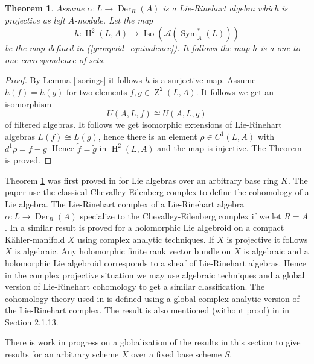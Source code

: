 \documentclass{amsart}
\theoremstyle{plain}
\newtheorem{theorem}{Theorem}[section]
\theoremstyle{definition}
\theoremstyle{remark}
\numberwithin{equation}{theorem}
\begin{document}
\begin{theorem}\label{maindeform}
  Assume $\alpha:L\rightarrow {\operatorname{Der} }_{R}({A})$ is a Lie-Rinehart algebra which is projective as left ${A}$-module.
Let the map
\[ h: {\operatorname{H} }^2(L,{A}) \rightarrow {\operatorname{Iso} } ({\mathcal{A}} ({\operatorname{Sym} }_{A}^*(L))) \]
be the map defined in (\ref{groupoid_equivalence}).
It follows the map $h$ is a one to one correspondence of sets.
\end{theorem}
\begin{proof} By Lemma \ref{isorings} it follows $h$ is a surjective map. Assume $h(f)=h(g)$ for two elements
$f,g\in {\operatorname{Z}}^2(L,{A})$. It follows we get an isomorphism
\[ U({A},L,f)\cong U({A},L,g) \]
of filtered algebras.
It follows we get isomorphic extensions of Lie-Rinehart algebras $L(f)\cong L(g)$, hence there is an element
$\rho \in C^1(L,{A})$ with $d^1\rho=f-g$. Hence $\tilde{f}=\tilde{g}$ in ${\operatorname{H} }^2(L,{A})$ and the map is injective. 
The Theorem is proved.
\end{proof}

Theorem \ref{maindeform} was first proved in \cite{sridharan} for Lie algebras over an arbitrary base ring $K$.
The paper \cite{sridharan} use the classical Chevalley-Eilenberg complex to define the cohomology
of a Lie algebra. The Lie-Rinehart complex of a Lie-Rinehart algebra $\alpha:L\rightarrow {\operatorname{Der} }_{R}({A})$ specialize
to the Chevalley-Eilenberg complex if we let ${R}={A}$.  
In \cite{tortella} a similar result is proved for a holomorphic Lie algebroid on a
compact K\"{a}hler-manifold $X$ using complex analytic techniques. If $X$ is projective it follows $X$ is algebraic.
Any holomorphic finite rank vector bundle on $X$ is algebraic and a holomorphic Lie algebroid corresponds to
a sheaf of Lie-Rinehart algebras. Hence in the complex projective situation we may use algebraic techniques 
and a global version of Lie-Rinehart cohomology to get a similar classification.
The cohomology theory used in \cite{tortella} is defined using a global complex analytic version of 
the Lie-Rinehart complex. The result is also mentioned (without proof) in \cite{beilinson} in Section 2.1.13.

There is work in progress on a globalization of the results in this section to give results for an arbitrary scheme
$X$ over a fixed base scheme $S$.
\end{document}
